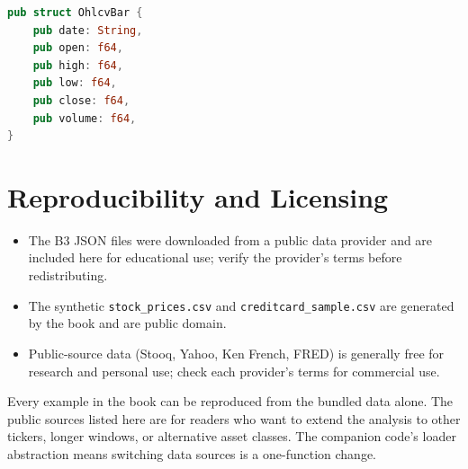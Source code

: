 \begin{lstlisting}[language=Rust]
pub struct OhlcvBar {
    pub date: String,
    pub open: f64,
    pub high: f64,
    pub low: f64,
    pub close: f64,
    pub volume: f64,
}
\end{lstlisting}

\section{Reproducibility and Licensing}

\begin{itemize}
    \item The B3 JSON files were downloaded from a public data provider
      and are included here for educational use; verify the provider's
      terms before redistributing.
    \item The synthetic \texttt{stock\_prices.csv} and
      \texttt{creditcard\_sample.csv} are generated by the book and are
      public domain.
    \item Public-source data (Stooq, Yahoo, Ken French, FRED) is
      generally free for research and personal use; check each
      provider's terms for commercial use.
\end{itemize}

\begin{keyinsight}
Every example in the book can be reproduced from the bundled data
alone. The public sources listed here are for readers who want to
extend the analysis to other tickers, longer windows, or alternative
asset classes. The companion code's loader abstraction means switching
data sources is a one-function change.
\end{keyinsight}